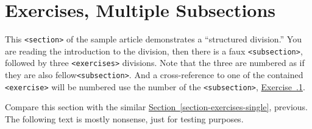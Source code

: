 \documentclass[pdflatex]{sn-jnl}
\theoremstyle{thmstyleone}%
\theoremstyle{thmstyletwo}%
\theoremstyle{thmstylethree}%
\newcommand{\xreffont}{\relax}
\newcommand{\mono}[1]{\texttt{#1}}
\numberwithin{equation}{section}
\begin{document}
\section{Exercises, Multiple Subsections}\label{section-exercises-multiple}%
This \mono{<section>} of the sample article demonstrates a ``structured division.''  You are reading the introduction to the division, then there is a faux \mono{<subsection>}, followed by three \mono{<exercises>} divisions.  Note that the three are numbered as if they are also fellow\mono{<subsection>}.  And a cross-reference to one of the contained \mono{<exercise>} will be numbered use the number of the \mono{<subsection>}, \hyperlink{exercise-challenging-one-structured}{Exercise~{\xreffont 38.3.1}}.%
\par
Compare this section with the similar \hyperref[section-exercises-single]{Section~{\xreffont\ref{section-exercises-single}}}, previous.  The following text is mostly nonsense, just for testing purposes.%
%
%
\typeout{************************************************}
\typeout{************************************************}
%
\end{document}
